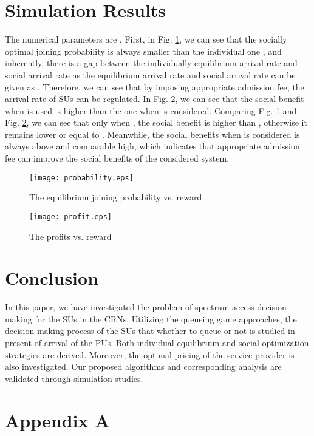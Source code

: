 \documentclass[journal]{IEEEtran}
\begin{document}
\section{Simulation Results}
The numerical parameters are . First, in Fig. \ref{fig:3}, we can see that the
socially optimal joining probability  is always smaller than
the individual one , and inherently, there is a gap between
the individually equilibrium arrival rate and social arrival rate
as the equilibrium arrival rate and social arrival rate can be
given as . Therefore, we can see
that by imposing appropriate admission fee, the arrival rate of
SUs can be regulated. In Fig. \ref{fig:4}, we can see that the
social benefit when  is used is higher than the one when
 is considered. Comparing Fig. \ref{fig:3} and Fig.
\ref{fig:4}, we can see that only when , the social benefit
is higher than , otherwise it remains lower or equal to .
Meanwhile, the social benefits when  is considered is always
above  and comparable high, which indicates that appropriate
admission fee can improve the social benefits of the considered
system.


\begin{figure}[t]
\centering
\texttt{[image: probability.eps]}
\caption{The equilibrium joining probability vs. reward} \label{fig:3}
\end{figure}


\begin{figure}[t]
\centering
\texttt{[image: profit.eps]}
\caption{The profits vs. reward} \label{fig:4}
\end{figure}



\section{Conclusion}
In this paper, we have investigated the problem of spectrum access
decision-making for the SUs in the CRNs. Utilizing
the queueing game approaches, the decision-making process of the SUs that
whether to queue or not is studied in present of arrival of the PUs.
Both individual equilibrium and social optimization strategies are
derived. Moreover, the optimal pricing of the service provider is also
investigated. Our proposed algorithms and corresponding analysis
are validated through simulation studies.


\section*{Appendix A}
\end{document}
